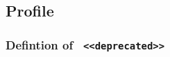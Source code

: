 \subsection{Profile} \label{model:Profile}
\subsubsection{Defintion of \texttt{ <<deprecated>>}}
  \label{type:deprecated}

\FloatBarrier



\FloatBarrier

